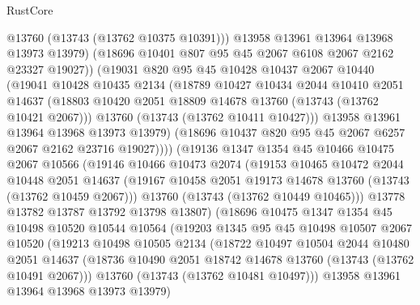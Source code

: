 \begin{lexlean}{RustCore}
\begin{coremodule}
                  @13760
                  (@13743 (@13762 @10375 @10391)))
                @13958
                @13961
                @13964
                @13968
                @13973
                @13979)
              (@18696 @10401 @807 @95 @45 @2067 @6108 @2067 @2162 @23327 @19027))
            (@19031
              @820
              @95
              @45
              @10428
              @10437
              @2067
              @10440
              (@19041
                @10428
                @10435
                @2134
                (@18789
                  @10427
                  @10434
                  @2044
                  @10410
                  @2051
                  @14637
                  (@18803 @10420 @2051 @18809 @14678 @13760 (@13743 (@13762 @10421 @2067)))
                  @13760
                  (@13743 (@13762 @10411 @10427)))
                @13958
                @13961
                @13964
                @13968
                @13973
                @13979)
              (@18696 @10437 @820 @95 @45 @2067 @6257 @2067 @2162 @23716 @19027))))
        (@19136
          @1347
          @1354
          @45
          @10466
          @10475
          @2067
          @10566
          (@19146
            @10466
            @10473
            @2074
            (@19153
              @10465
              @10472
              @2044
              @10448
              @2051
              @14637
              (@19167 @10458 @2051 @19173 @14678 @13760 (@13743 (@13762 @10459 @2067)))
              @13760
              (@13743 (@13762 @10449 @10465)))
            @13778
            @13782
            @13787
            @13792
            @13798
            @13807)
          (@18696
            @10475
            @1347
            @1354
            @45
            @10498
            @10520
            @10544
            @10564
            (@19203
              @1345
              @95
              @45
              @10498
              @10507
              @2067
              @10520
              (@19213
                @10498
                @10505
                @2134
                (@18722
                  @10497
                  @10504
                  @2044
                  @10480
                  @2051
                  @14637
                  (@18736 @10490 @2051 @18742 @14678 @13760 (@13743 (@13762 @10491 @2067)))
                  @13760
                  (@13743 (@13762 @10481 @10497)))
                @13958
                @13961
                @13964
                @13968
                @13973
                @13979)

\end{coremodule}
\end{lexlean}
